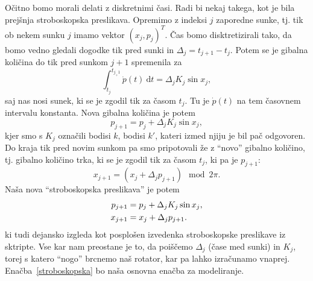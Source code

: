 \documentclass[a4paper, 12pt]{article}
\renewcommand{\d}{
	\ensuremath{\mathrm{d}}
}
\begin{document}
O\v citno bomo morali delati z diskretnimi \v casi. Radi bi nekaj takega, kot je bila prej\v snja stroboskopska preslikava.
Opremimo z indeksi $j$ zaporedne sunke, tj. tik ob nekem sunku $j$ imamo vektor $(x_j, p_j)^T$. \v Cas bomo disktretizirali
tako, da bomo vedno gledali dogodke tik pred sunki in $\Delta_j = t_{j+1} - t_j$. Potem se je gibalna koli\v cina do tik pred
sunkom $j+1$ spremenila za
\[
	\int_{t_j}^{t_{j_+1}} \dot{p}(t)\ \d t  = \Delta_j K_j \sin x_j,
\]
saj nas nosi sunek, ki se je zgodil tik za \v casom $t_j$. Tu je $\dot{p}(t)$ na tem \v casovnem intervalu konstanta. Nova
gibalna koli\v cina je potem
\begin{equation*}
	p_{j+1} = p_j + \Delta_j K_j \sin x_j,
\end{equation*}
kjer smo s $K_j$ ozna\v cili bodisi $k$, bodisi $k'$, kateri izmed njiju je bil pa\v c odgovoren. Do kraja tik pred novim
sunkom pa smo pripotovali \v ze z "`novo"' gibalno koli\v cino, tj. gibalno koli\v cino trka, ki se je zgodil tik za \v casom
$t_j$, ki pa je $p_{j+1}$:
\begin{equation*}
	x_{j+1} = (x_j + \Delta_j p_{j+1}) \mod 2\pi.
\end{equation*}
Na\v sa nova "`stroboskopska preslikava"' je potem
\begin{align}
	p_{j+1} &= p_j + \Delta_j K_j \sin x_j, \notag \\
	x_{j+1} &= x_j + \Delta_j p_{j+1}.
	\label{stroboskopska}
\end{align}
ki tudi dejansko izgleda kot posplo\v sen izvedenka stroboskopske preslikave iz sktripte.
Vse kar nam preostane je to, da poi\v s\v cemo $\Delta_j$ (\v case med sunki) in $K_j$, torej s katero "`nogo"' brcnemo na\v s
rotator, kar pa lahko izra\v cunamo vnaprej. Ena\v cba~\eqref{stroboskopska} bo na\v sa osnovna ena\v cba za modeliranje.
\end{document}
